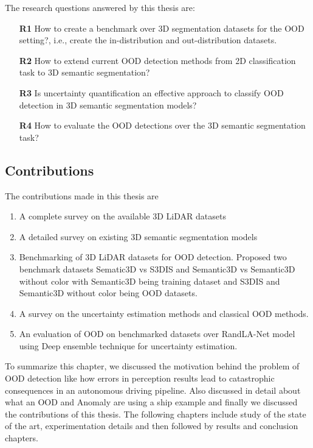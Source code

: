 The research questions answered by this thesis are:
\begin{itemize}
    \item[\textbf{R1}] How to create a benchmark over 3D segmentation datasets for the OOD setting?, i.e., create the in-distribution and out-distribution datasets.
    \item[\textbf{R2}] How to extend current OOD detection methods from 2D classification task to 3D semantic segmentation?
    \item[\textbf{R3}] Is uncertainty quantification an effective approach to classify OOD detection in 3D semantic segmentation models?
    \item[\textbf{R4}] How to evaluate the OOD detections over the 3D semantic segmentation task?
\end{itemize}

\subsection{Contributions}
The contributions made in this thesis are
\begin{enumerate}
    \item A complete survey on the available 3D LiDAR datasets
    \item A detailed survey on existing 3D semantic segmentation models
    \item Benchmarking of 3D LiDAR datasets for OOD detection. Proposed two benchmark datasets Sematic3D vs S3DIS and Semantic3D vs Semantic3D without color with Semantic3D being training dataset and S3DIS and Semantic3D without color being OOD datasets.
    \item A survey on the uncertainty estimation methods and classical OOD methods.
    \item An evaluation of OOD on benchmarked datasets over RandLA-Net model using Deep ensemble technique for uncertainty estimation.
\end{enumerate}

To summarize this chapter, we discussed the motivation behind the problem of OOD detection like how errors in perception results lead to catastrophic consequences in an autonomous driving pipeline.
Also discussed in detail about what an OOD and Anomaly are using a ship example and finally we discussed the contributions of this thesis.
The following chapters include study of the state of the art, experimentation details and then followed by results and conclusion chapters.

